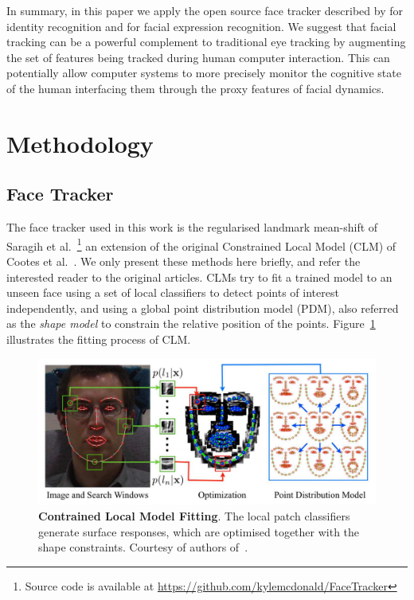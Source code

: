 \documentclass[]{article}
\begin{document}
In summary, in this paper we apply the open source face tracker described by \cite{saragih2011deformable} for identity
recognition and for facial expression recognition. We suggest that facial tracking can be a powerful complement to
traditional eye tracking  by augmenting the set of features being tracked during human computer interaction. This  can
potentially allow computer systems to more precisely monitor the cognitive state of the human interfacing them through
the proxy features of facial dynamics.


\section{Methodology}


\subsection{Face Tracker}
The face tracker used in this work is the regularised landmark mean-shift of Saragih et
al.~\cite{saragih2011deformable}\footnote{Source code is available at
  \url{https://github.com/kylemcdonald/FaceTracker}} an extension of
the original Constrained Local Model (CLM) of Cootes et al.~\cite{cristinacce2006feature}. We only present these methods
here briefly, and refer the interested reader to the original articles. CLMs try to fit a trained model to an unseen
face using a set of local classifiers to detect points of interest independently, and using a global point distribution model (PDM),
also referred as the \textit{shape model} to constrain the relative position of the points. Figure~\ref{fig:CLM}
illustrates the fitting process of CLM.

\begin{figure}[htbp]
  \centering
  \includegraphics[width=12cm]{figures/CLM.png}
  \caption{\textbf{Contrained Local Model Fitting}. The local patch classifiers generate surface responses, which are
  optimised together with the shape constraints. Courtesy of authors of~\cite{saragih2011deformable}.}
  \label{fig:CLM}
\end{figure}
\end{document}

